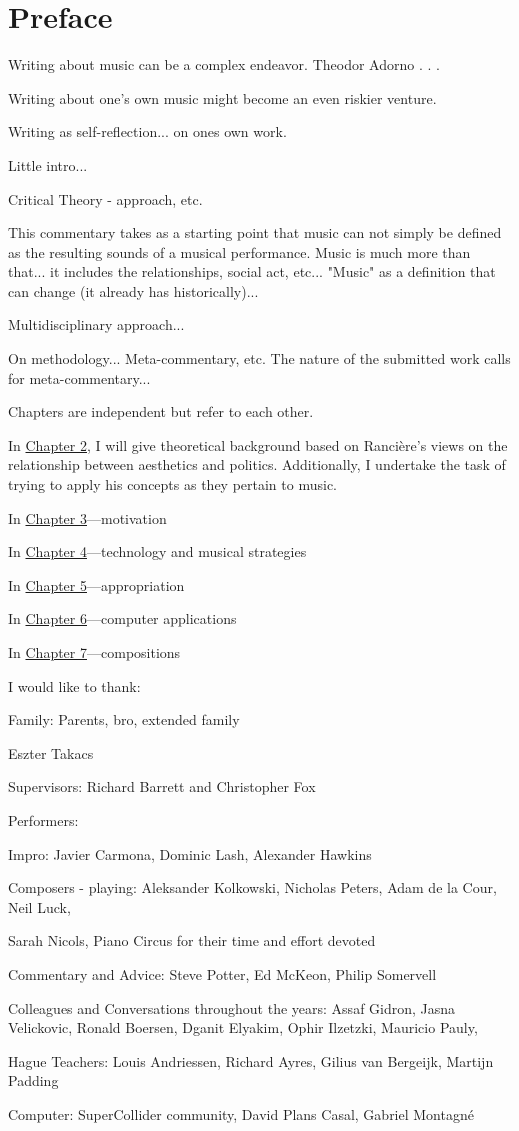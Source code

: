 \chapter{Preface}


Writing about music can be a complex endeavor. Theodor Adorno . . .

Writing about one's own music might become an even riskier venture.

Writing as self-reflection... on ones own work.

Little intro... 

Critical Theory - approach, etc.

This commentary takes as a starting point that music can not simply be defined as the resulting sounds of a musical performance. Music is much more than that... it includes the relationships, social act, etc... "Music" as a definition that can change (it already has historically)...

Multidisciplinary approach...

On methodology... Meta-commentary, etc. The nature of the submitted work calls for meta-commentary...

Chapters are independent but refer to each other.

In \hyperlink{chapter2}{Chapter 2}, I will give theoretical background based on Ranci\`{e}re's views on the relationship between aesthetics and politics. Additionally, I undertake the task of trying to apply his concepts as they pertain to music. 

In \hyperlink{chapter3}{Chapter 3}---motivation

In \hyperlink{chapter4}{Chapter 4}---technology and musical strategies 

In \hyperlink{chapter5}{Chapter 5}---appropriation

In \hyperlink{chapter6}{Chapter 6}---computer applications

In \hyperlink{chapter7}{Chapter 7}---compositions

I would like to thank:

Family: Parents, bro, extended family 

Eszter Takacs

Supervisors: Richard Barrett and Christopher Fox

Performers: 

Impro: Javier Carmona, Dominic Lash, Alexander Hawkins

Composers - playing: Aleksander Kolkowski, Nicholas Peters, Adam de la Cour, Neil Luck, 

Sarah Nicols, Piano Circus for their time and effort devoted

Commentary and Advice: Steve Potter, Ed McKeon, Philip Somervell

Colleagues and Conversations throughout the years:  Assaf Gidron, Jasna Velickovic, Ronald Boersen, Dganit Elyakim, Ophir Ilzetzki, Mauricio Pauly, 

Hague Teachers: Louis Andriessen, Richard Ayres, Gilius van Bergeijk, Martijn Padding

Computer: SuperCollider community, David Plans Casal, Gabriel Montagn\'e

\label{ch:preface}